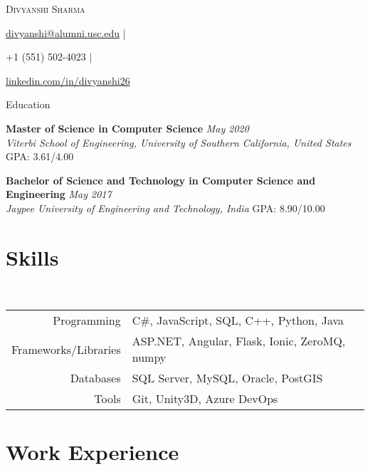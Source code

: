 \documentclass[letterpaper,10pt]{article}
\newcommand{\organization}[4]{
    \vspace{1.5pt}
    \textbf{#1} \hfill{\emph{#2}} \\
    \emph{#3} \hfill{#4} \\
    \vspace{3pt}
}
\newcommand{\skills}[4]{
    \vspace{-2pt}
    \ \ \ \ \ \ \ \ \ \ \ 
    \begin{tabular}{r!{\color{burgundy}\vrule}l}
          Programming & #1 \\
          Frameworks/Libraries & #2 \\
          Databases & #3 \\
          Tools & #4
    \end{tabular}
    \vspace{4pt}
}
\newcommand{\myEmail}[1]{
    \href{mailto:#1}{#1} |
}
\newcommand{\myPhone}[1]{
    {#1} |
}
\newcommand{\mySite}[1]{
    \href{https://linkedin.com/in/divyanshi26}{#1}
}
\newcommand{\myName}[5]{
    \begin{center}
        {\huge{\color{burgundy}\scshape{#1}}} \\
        \vspace{6pt}
        \myEmail{#2}
        \myPhone{#3}
        \mySite{#4}
    \end{center}
    \vspace{-4pt}
}
\begin{document}
    \myName{Divyanshi Sharma}{divyanshi@alumni.usc.edu}{+1 (551) 502-4023}{linkedin.com/in/divyanshi26}

    \section{Education}
        
    \organization{Master of Science in Computer Science}{May 2020}
        {Viterbi School of Engineering, University of Southern California, United States}{GPA: 3.61/4.00}

	\organization{Bachelor of Science and Technology in Computer Science and Engineering}{May 2017}
        {Jaypee University of Engineering and Technology, India}{GPA: 8.90/10.00}
	\vspace{6pt}
    
    \section{Skills}
    
    \skills
        {C\#, JavaScript, SQL, C++, Python, Java}  %
        {ASP.NET, Angular, Flask, Ionic, ZeroMQ, numpy}  %
        {SQL Server, MySQL, Oracle, PostGIS}  %
        {Git, Unity3D, Azure DevOps}  %

    \section{Work Experience}

\end{document}
